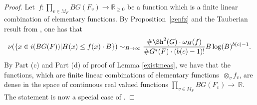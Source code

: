 \documentclass[a4paper,english,12pt]{amsart}
\newcommand{\QQ}{\mathbb{Q}}
\newcommand{\RR}{\mathbb{R}}
\newcommand{\vMF}{v\in M_F}
\newcommand{\muu}{\boldsymbol{\mu}}
\DeclareMathOperator{\Hom}{Hom}
\newtheorem{mydef}[equation]{Definition}
\numberwithin{equation}{subsection}
\begin{document}
\begin{proof}
Let~$f:\prod_{\vMF}BG(F_v)\to\RR_{\geq 0}$ be a function which is a finite linear combination of elementary functions. By Proposition~\ref{genfz} and the Tauberian result from \cite[Theorem 3.3.2]{aniso}, one has that \begin{align*}\nu(\{x\in i(BG(F))| H(x)\leq f(x)\cdot B\})\sim_{B\to\infty}\frac{\#\Sh^2(G)\cdot\omega_H(f)}{\#G^*(F)\cdot(b(c)-1)!}{B\log(B)^{b(c)-1}}.
\end{align*} 
By Part (c) and Part (d) of proof of Lemma \ref{existmeas}, we have that the functions, which are finite linear combinations of elementary functions~$\otimes_vf_v$, are dense in the space of continuous real valued functions $\prod_{\vMF}BG(F_v)\to~\RR$. The statement is now a special case of \cite[Proposition 2.10]{Igusa}. 
\end{proof}
\end{document}

